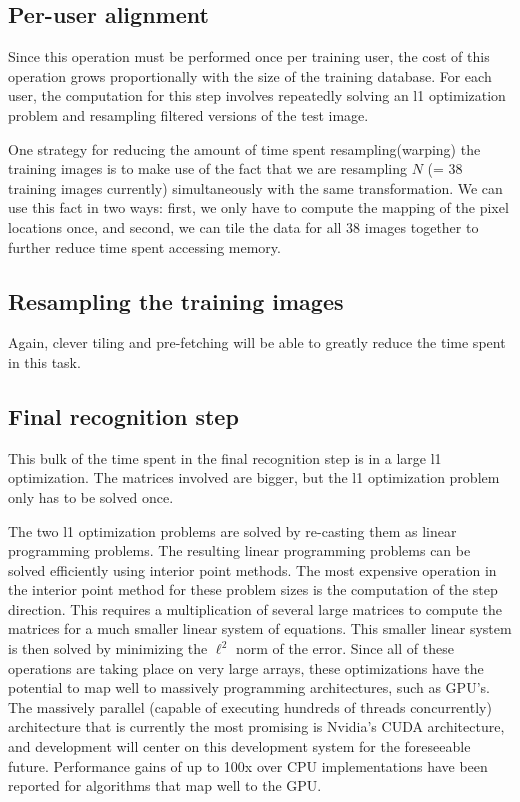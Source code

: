 \subsection{Per-user alignment}  
Since this operation must be performed once per training user, the cost of this operation grows proportionally with the size of the training database.  For each user, the computation for this step involves repeatedly solving an l1 optimization problem and resampling filtered versions of the test image.  

One strategy for reducing the amount of time spent resampling(warping) the training images is to make use of the fact that we are resampling $N$ (= 38 training images currently) simultaneously with the same transformation.  We can use this fact in two ways: first, we only have to compute the mapping of the pixel locations once, and second, we can tile the data for all 38 images together to further reduce time spent accessing memory.   

\subsection{Resampling the training images}  
Again, clever tiling and pre-fetching will be able to greatly reduce the time spent in this task.

\subsection{Final recognition step}
This bulk of the time spent in the final recognition step is in a large l1 optimization.  The matrices involved are bigger, but the l1 optimization problem only has to be solved once.  

The two l1 optimization problems are solved by re-casting them as linear programming problems.  The resulting linear programming problems can be solved efficiently using interior point methods.  The most expensive operation in the interior point method for these problem sizes is the computation of the step direction.  This requires a multiplication of several large matrices to compute the matrices for a much smaller linear system of equations.  This smaller linear system is then solved by minimizing the $\ell^2$ norm of the error.  Since all of these operations are taking place on very large arrays, these optimizations have the potential to map well to massively programming architectures, such as GPU's.  The massively parallel (capable of executing hundreds of threads concurrently) architecture that is currently the most promising is Nvidia's CUDA architecture, and development will center on this development system for the foreseeable future.  Performance gains of up to 100x over CPU implementations have been reported for algorithms that map well to the GPU.

